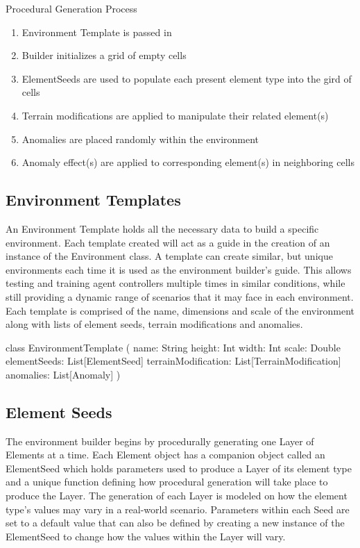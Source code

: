 Procedural Generation Process
\begin{enumerate}
  \item Environment Template is passed in
  \item	Builder initializes a grid of empty cells
  \item	ElementSeeds are used to populate each present element type into the gird of cells
  \item	Terrain modifications are applied to manipulate their related element(s)
  \item	Anomalies are placed randomly within the environment
  \item	Anomaly effect(s) are applied to corresponding element(s) in neighboring cells
\end{enumerate}


\subsection{Environment Templates}
An Environment Template holds all the necessary data to build a specific environment.
Each template created will act as a guide in the creation of an instance of the Environment class.
A template can create similar, but unique environments each time it is used as the environment builder's guide.
This allows testing and training agent controllers multiple times in similar conditions, while still providing a dynamic range of scenarios that it may face in each environment.
Each template is comprised of the name, dimensions and scale of the environment along with lists of element seeds, terrain modifications and anomalies.

class EnvironmentTemplate (
  name: String
  height: Int
  width: Int
  scale: Double
  elementSeeds: List[ElementSeed]
  terrainModification: List[TerrainModification]
  anomalies: List[Anomaly]
)


\subsection{Element Seeds}
The environment builder begins by procedurally generating one Layer of Elements at a time.
Each Element object has a companion object called an ElementSeed which holds parameters used to produce a Layer of its element type and a unique function defining how procedural generation will take place to produce the Layer.
The generation of each Layer is modeled on how the element type's values may vary in a real-world scenario.
Parameters within each Seed are set to a default value that can also be defined by creating a new instance of the ElementSeed to change how the values within the Layer will vary.

